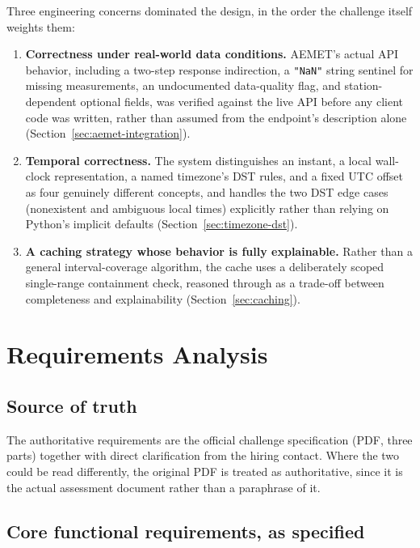 \documentclass[11pt,a4paper]{article}
\begin{document}
Three engineering concerns dominated the design, in the order the challenge
itself weights them:

\begin{enumerate}[nosep]
    \item \textbf{Correctness under real-world data conditions.} AEMET's
    actual API behavior, including a two-step response indirection, a
    \texttt{"NaN"} string sentinel for missing measurements, an
    undocumented data-quality flag, and station-dependent optional fields,
    was verified against the live API before any client code was written,
    rather than assumed from the endpoint's description alone
    (Section~\ref{sec:aemet-integration}).
    \item \textbf{Temporal correctness.} The system distinguishes an
    instant, a local wall-clock representation, a named timezone's DST
    rules, and a fixed UTC offset as four genuinely different concepts,
    and handles the two DST edge cases (nonexistent and ambiguous local
    times) explicitly rather than relying on Python's implicit defaults
    (Section~\ref{sec:timezone-dst}).
    \item \textbf{A caching strategy whose behavior is fully explainable.}
    Rather than a general interval-coverage algorithm, the cache uses a
    deliberately scoped single-range containment check, reasoned through
    as a trade-off between completeness and explainability
    (Section~\ref{sec:caching}).
\end{enumerate}

\section{Requirements Analysis}
\label{sec:requirements}

\subsection{Source of truth}

The authoritative requirements are the official challenge specification
(PDF, three parts) together with direct clarification from the hiring
contact. Where the two could be read differently, the original PDF is
treated as authoritative, since it is the actual assessment document rather
than a paraphrase of it.

\subsection{Core functional requirements, as specified}
\end{document}
